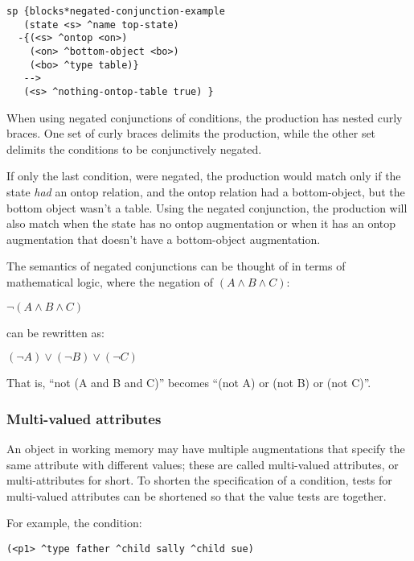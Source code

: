 \begin{verbatim}
sp {blocks*negated-conjunction-example
   (state <s> ^name top-state)
  -{(<s> ^ontop <on>)
    (<on> ^bottom-object <bo>)
    (<bo> ^type table)}
   -->
   (<s> ^nothing-ontop-table true) }
\end{verbatim}

When using negated conjunctions of conditions, the production has nested curly braces. One set of curly braces delimits the production, while the other set delimits the conditions to be conjunctively negated.

If only the last condition,  were negated, the production would match only if the state \emph{had} an ontop relation, and the ontop relation had a bottom-object, but the bottom object wasn't a table. Using the negated conjunction, the production will also match when the state has no ontop augmentation or when it has an ontop augmentation that doesn't have a bottom-object augmentation.

The semantics of negated conjunctions can be thought of in terms of mathematical logic, where the negation of $(A \wedge B \wedge C)$:

$\neg (A \wedge B \wedge C)$

can be rewritten as:

$(\neg A) \vee (\neg B) \vee (\neg C)$

That is, ``not (A and B and C)'' becomes ``(not A) or (not B) or (not C)''.



\subsubsection{Multi-valued attributes}
\label{SYNTAX-pm-lhs-multi}

An object in working memory may have multiple augmentations that specify the same attribute with different values; these are called multi-valued attributes, or multi-attributes for short.  To shorten the specification of a condition, tests for multi-valued attributes can be shortened so that the value tests are together.

For example, the condition:

\begin{verbatim}
(<p1> ^type father ^child sally ^child sue)
\end{verbatim}

